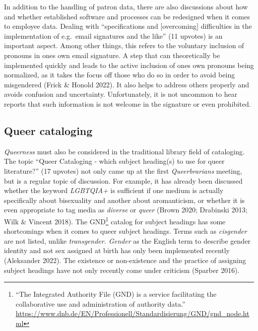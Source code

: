 \documentclass[a4paper,
fontsize=11pt,
oneside,
numbers=noperiodatend,
parskip=half-,
bibliography=totoc,
final
]{scrartcl}
\begin{document}
In addition to the handling of patron data, there are also discussions
about how and whether established software and processes can be
redesigned when it comes to employee data. Dealing with \enquote{specifications
and {[}overcoming{]} difficulties in the implementation of e.g.~email
signatures and the like} (11 upvotes) is an important aspect. Among
other things, this refers to the voluntary inclusion of pronouns in
one\textquotesingle s own email signature. A step that can theoretically
be implemented quickly and leads to the active inclusion of
one\textquotesingle s own pronouns being normalized, as it takes the
focus off those who do so in order to avoid being misgendered (Frick \&
Honold 2022). It also helps to address others properly and avoids
confusion and uncertainty. Unfortunately, it is not uncommon to hear
reports that such information is not welcome in the signature or even
prohibited.

\hypertarget{queer-cataloging}{%
\subsection{Queer cataloging}\label{queer-cataloging}}

\emph{Queerness} must also be considered in the traditional library
field of cataloging. The topic \enquote{Queer Cataloging - which subject
heading(s) to use for queer literature?} (17 upvotes) not only came up
at the first \emph{Queerbrarians} meeting, but is a regular topic of
discussion. For example, it has already been discussed whether the
keyword \emph{LGBTQIA+} is sufficient if one medium is actually
specifically about bisexuality and another about aromanticism, or
whether it is even appropriate to tag media as \emph{diverse} or
\emph{queer} (Brown 2020; Drabinski 2013; Wilk \& Vincent 2018). The
GND\footnote{\enquote{The Integrated Authority File (GND) is a service
  facilitating the collaborative use and administration of authority
  data.}
  \url{https://www.dnb.de/EN/Professionell/Standardisierung/GND/gnd_node.html}}
catalog for subject headings has some shortcomings when it comes to
queer subject headings. Terms such as \emph{cisgender} are not listed,
unlike \emph{transgender. Gender} as the English term to describe gender
identity and not sex assigned at birth has only been implemented
recently (Aleksander 2022). The existence or non-existence and the
practice of assigning subject headings have not only recently come under
criticism (Sparber 2016).
\end{document}
